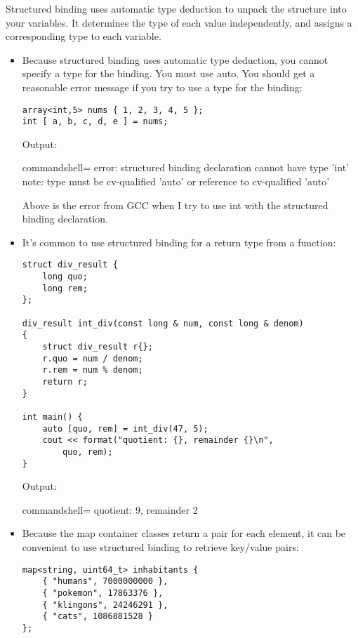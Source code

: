 Structured binding uses automatic type deduction to unpack the structure into your variables. It determines the type of each value independently, and assigns a corresponding type to each variable.

\begin{itemize}
\item 
Because structured binding uses automatic type deduction, you cannot specify a type for the binding. You must use auto. You should get a reasonable error message if you try to use a type for the binding:

\begin{lstlisting}[style=styleCXX]
array<int,5> nums { 1, 2, 3, 4, 5 };
int [ a, b, c, d, e ] = nums;
\end{lstlisting}

Output:

\begin{tcblisting}{commandshell={}}
error: structured binding declaration cannot have type 'int'
note: type must be cv-qualified 'auto' or reference to
cv-qualified 'auto'
\end{tcblisting}

Above is the error from GCC when I try to use int with the structured binding declaration.

\item 
It's common to use structured binding for a return type from a function:

\begin{lstlisting}[style=styleCXX]
struct div_result {
	long quo;
	long rem;
};

div_result int_div(const long & num, const long & denom)
{
	struct div_result r{};
	r.quo = num / denom;
	r.rem = num % denom;
	return r;
}

int main() {
	auto [quo, rem] = int_div(47, 5);
	cout << format("quotient: {}, remainder {}\n",
		quo, rem);
}
\end{lstlisting}

Output:

\begin{tcblisting}{commandshell={}}
quotient: 9, remainder 2
\end{tcblisting}

\item 
Because the map container classes return a pair for each element, it can be convenient to use structured binding to retrieve key/value pairs:

\begin{lstlisting}[style=styleCXX]
map<string, uint64_t> inhabitants {
	{ "humans", 7000000000 },
	{ "pokemon", 17863376 },
	{ "klingons", 24246291 },
	{ "cats", 1086881528 }
};


\end{lstlisting}
\end{itemize}
